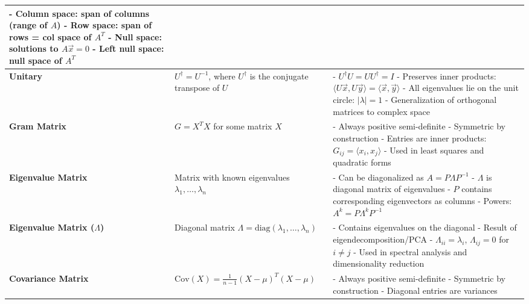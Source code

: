 \documentclass[12pt]{article}
\begin{document}
\begin{longtable}{|>{\bfseries}m{3.5cm}|m{5cm}|m{10.5cm}|}
		- Column space: span of columns (range of $A$) \newline
		- Row space: span of rows = col space of $A^T$ \newline
		- Null space: solutions to $A\vec{x} = 0$ \newline
		- Left null space: null space of $A^T$ \\
		\hline
		Unitary & $U^\dagger = U^{-1}$, where $U^\dagger$ is the conjugate
		transpose of $U$ &
		- $U^\dagger U = U U^\dagger = I$ \newline
		- Preserves inner products: $\langle U\vec{x}, U\vec{y} \rangle =
		\langle \vec{x}, \vec{y} \rangle$ \newline
		- All eigenvalues lie on the unit circle: $|\lambda| = 1$ \newline
		- Generalization of orthogonal matrices to complex space \\
		\hline
		Gram Matrix & $G = X^T X$ for some matrix $X$ &
		- Always positive semi-definite \newline
		- Symmetric by construction \newline
		- Entries are inner products: $G_{ij} = \langle x_i, x_j \rangle$ \newline
		- Used in least squares and quadratic forms \\
		\hline
		Eigenvalue Matrix & Matrix with known eigenvalues $\lambda_1, \ldots, \lambda_n$ &
		- Can be diagonalized as $A = P\Lambda P^{-1}$ \newline
		- $\Lambda$ is diagonal matrix of eigenvalues \newline
		- $P$ contains corresponding eigenvectors as columns \newline
		- Powers: $A^k = P\Lambda^k P^{-1}$ \\
		\hline
		Eigenvalue Matrix ($\Lambda$) & Diagonal matrix $\Lambda = \text{diag}(\lambda_1,
		\ldots, \lambda_n)$ &
		- Contains eigenvalues on the diagonal \newline
		- Result of eigendecomposition/PCA \newline
		- $\Lambda_{ii} = \lambda_i$, $\Lambda_{ij} = 0$ for $i \neq j$ \newline
		- Used in spectral analysis and dimensionality reduction \\
		\hline
		Covariance Matrix & $\text{Cov}(X) = \frac{1}{n-1}(X - \mu)^T(X - \mu)$ &
		- Always positive semi-definite \newline
		- Symmetric by construction \newline
		- Diagonal entries are variances \newline

\end{longtable}
\end{document}
